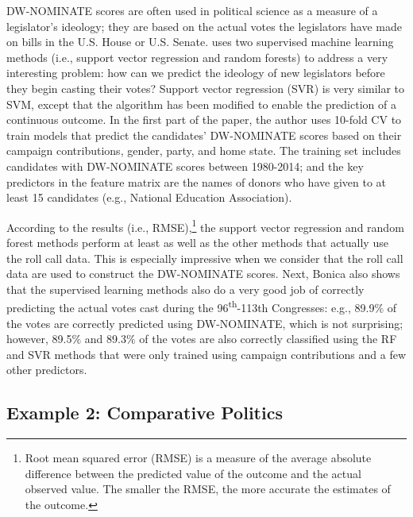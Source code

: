\documentclass{book}
\begin{document}
DW-NOMINATE scores are often used in political science as a measure of a
legislator's ideology; they are based on the actual votes the legislators have
made on bills in the U.S. House or U.S. Senate. uses two supervised machine
learning methods (i.e., support vector regression and random forests) to
address a very interesting problem: how can we predict the ideology of new
legislators before they begin casting their votes? Support vector regression
(SVR) is very similar to SVM, except that the algorithm has been modified to
enable the prediction of a continuous outcome. In the first part of the paper,
the author uses 10-fold CV to train models that predict the candidates'
DW-NOMINATE scores based on their campaign contributions, gender, party, and
home state. The training set includes candidates with DW-NOMINATE scores
between 1980-2014; and the key predictors in the feature matrix are the names
of donors who have given to at least 15 candidates (e.g., National Education
Association).

According to the results (i.e., RMSE),\footnote{Root mean squared error (RMSE)
  is a measure of the average absolute difference between the predicted value
  of the outcome and the actual observed value. The smaller the RMSE, the more
  accurate the estimates of the outcome.} the support vector regression and
random forest methods perform at least as well as the other methods that
actually use the roll call data. This is especially impressive when we
consider that the roll call data are used to construct the DW-NOMINATE scores.
Next, Bonica also shows that the supervised learning methods also do a very
good job of correctly predicting the actual votes cast during the
96\textsuperscript{th}-113th Congresses: e.g., 89.9\(\%\) of the votes are
correctly predicted using DW-NOMINATE, which is not surprising; however,
89.5\(\%\) and 89.3\(\%\) of the votes are also correctly classified using the
RF and SVR methods that were only trained using campaign contributions and a
few other predictors.

\hypertarget{example-2-comparative-politics}{%
\subsection{Example 2: Comparative
Politics}\label{example-2-comparative-politics}}
\end{document}
